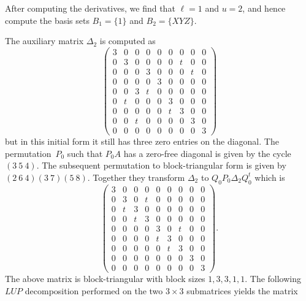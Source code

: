 After computing the derivatives, we find that $\ell = 1$ and $u = 2$, and 
hence compute the basis sets $B_1 = \{1\}$ and $B_2 = \{XYZ\}$.

The auxiliary matrix $\Delta_2$ is computed as 
\begin{equation*}
\renewcommand{\arraystretch}{0.68}
\begin{pmatrix}
3 & 0 & 0 & 0 & 0 & 0 & 0 & 0 & 0 \\
0 & 3 & 0 & 0 & 0 & 0 & t & 0 & 0 \\
0 & 0 & 0 & 3 & 0 & 0 & 0 & t & 0 \\
0 & 0 & 0 & 0 & 3 & 0 & 0 & 0 & 0 \\
0 & 0 & 3 & t & 0 & 0 & 0 & 0 & 0 \\
0 & t & 0 & 0 & 0 & 3 & 0 & 0 & 0 \\
0 & 0 & 0 & 0 & 0 & t & 3 & 0 & 0 \\
0 & 0 & t & 0 & 0 & 0 & 0 & 3 & 0 \\
0 & 0 & 0 & 0 & 0 & 0 & 0 & 0 & 3
\end{pmatrix}
\end{equation*}
but in this initial form it still has three zero entries on the diagonal.  
The permutation~$P_0$ such that $P_0 A$ has a zero-free diagonal is given 
by the cycle $(3~5~4)$.  The subsequent permutation to block-triangular 
form is given by $(2~6~4)(3~7)(5~8)$.  Together they transform $\Delta_2$ 
to $Q_0 P_0 \Delta_2 Q_0^t$ which is 
\begin{equation*}
\renewcommand{\arraystretch}{0.68}
\begin{pmatrix}
3 & 0 & 0 & 0 & 0 & 0 & 0 & 0 & 0 \\
0 & 3 & 0 & t & 0 & 0 & 0 & 0 & 0 \\
0 & t & 3 & 0 & 0 & 0 & 0 & 0 & 0 \\
0 & 0 & t & 3 & 0 & 0 & 0 & 0 & 0 \\
0 & 0 & 0 & 0 & 3 & 0 & t & 0 & 0 \\
0 & 0 & 0 & 0 & t & 3 & 0 & 0 & 0 \\
0 & 0 & 0 & 0 & 0 & t & 3 & 0 & 0 \\
0 & 0 & 0 & 0 & 0 & 0 & 0 & 3 & 0 \\
0 & 0 & 0 & 0 & 0 & 0 & 0 & 0 & 3
\end{pmatrix}.
\end{equation*}
The above matrix is block-triangular with block sizes $1, 3, 3, 1, 1$. 
The following $LUP$ decomposition performed on the two $3 \times 3$ 
submatrices yields the matrix
